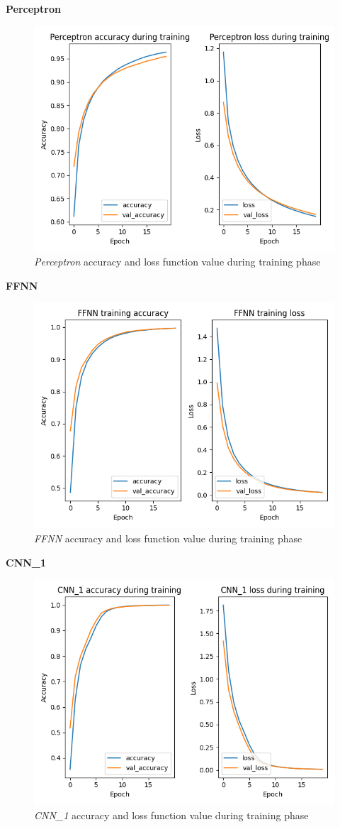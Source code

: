 \textbf{Perceptron}

\begin{figure}[h!]
\centering
\includegraphics[width=0.68\linewidth]{../images/perceptron_training_accuracy.png}
\caption{\emph{Perceptron} accuracy and loss function value during training phase}
\end{figure}

\textbf{FFNN}

\begin{figure}[h!]
\centering
\includegraphics[width=0.68\linewidth]{../images/ffnn_training_accuracy.png}
\caption{\emph{FFNN} accuracy and loss function value during training phase}
\end{figure}

\textbf{CNN\_1}

\begin{figure}[h!]
\centering
\includegraphics[width=0.68\linewidth]{../images/cnn_1_training_accuracy.png}
\caption{\emph{CNN\_1} accuracy and loss function value during training phase}
\end{figure}

